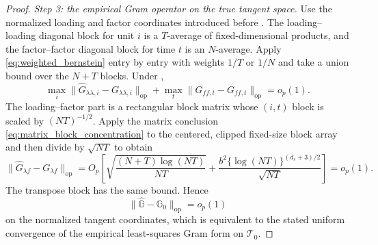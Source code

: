 \documentclass[11pt]{article}
\numberwithin{equation}{section}
\theoremstyle{remark}
\newcommand{\op}{\operatorname{op}}
\newcommand{\calT}{\mathcal T}
\begin{document}
\begin{proof}
\emph{Step 3: the empirical Gram operator on the true tangent space.}
Use the normalized loading and factor coordinates introduced before . The loading--loading diagonal block for unit $i$ is a $T$-average of fixed-dimensional products, and the factor--factor diagonal block for time $t$ is an $N$-average. Apply \eqref{eq:weighted_bernstein} entry by entry with weights $1/T$ or $1/N$ and take a union bound over the $N+T$ blocks. Under ,
\[
\max_i\|\widehat G_{\lambda\lambda,i}-G_{\lambda\lambda,i}\|_{\op}
+
\max_t\|\widehat G_{ff,t}-G_{ff,t}\|_{\op}
=o_p(1).
\]
The loading--factor part is a rectangular block matrix whose $(i,t)$ block is scaled by $(NT)^{-1/2}$. Apply the matrix conclusion \eqref{eq:matrix_block_concentration} to the centered, clipped fixed-size block array and then divide by $\sqrt{NT}$ to obtain
\[
\|\widehat G_{\lambda f}-G_{\lambda f}\|_{\op}
=
O_p\!\left[
\sqrt{\frac{(N+T)\log(NT)}{NT}}
+
\frac{b^2\{\log(NT)\}^{(d_s+3)/2}}{\sqrt{NT}}
\right]
=o_p(1).
\]
The transpose block has the same bound. Hence
\[
\|\widehat{\mathbb G}-\mathbb G_0\|_{\op}=o_p(1)
\]
on the normalized tangent coordinates, which is equivalent to the stated uniform convergence of the empirical least-squares Gram form on $\calT_0$.
\end{proof}
\end{document}
